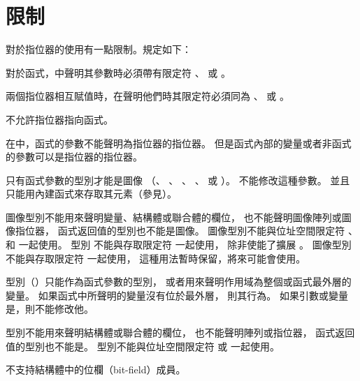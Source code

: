 \section[section:restrictions]{限制}

\startigBig

\startitem
對於指位器的使用有一點限制。規定如下：
\startigBig

\startitem
對於函式，中聲明其參數時必須帶有限定符
 、  或 。
\stopitem

\startitem
兩個指位器相互賦值時，在聲明他們時其限定符必須同為
 、  或 。
\stopitem

\startitem
不允許指位器指向函式。
\stopitem

\startitem
在中，函式的參數不能聲明為指位器的指位器。
但是函式內部的變量或者非函式的參數可以是指位器的指位器。
\stopitem

\stopigBig
\stopitem

\startitem
只有函式參數的型別才能是圖像
（、 、 、
、  或 ）。
不能修改這種參數。
並且只能用內建函式來存取其元素（參見\insection[imgRwFunc]）。

圖像型別不能用來聲明變量、結構體或聯合體的欄位，
也不能聲明圖像陣列或圖像指位器，
函式返回值的型別也不能是圖像。
圖像型別不能與位址空間限定符
 、  和  一起使用。
型別  不能與存取限定符  一起使用，
除非使能了擴展 。
圖像型別不能與存取限定符  一起使用，
這種用法暫時保留，將來可能會使用。

型別（）只能作為函式參數的型別，
或者用來聲明作用域為整個或函式最外層的變量。
如果函式中所聲明的變量沒有位於最外層，
則其行為。
如果引數或變量是，則不能修改他。

型別不能用來聲明結構體或聯合體的欄位，
也不能聲明陣列或指位器，
函式返回值的型別也不能是。
型別不能與位址空間限定符  或  一起使用。
\stopitem

不支持結構體中的位欄（bit-field）成員。
\stopitem

